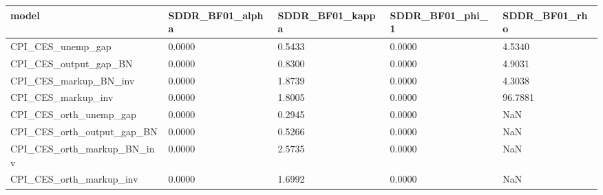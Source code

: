 \begin{tabular}{lllll}
\toprule
model & SDDR_BF01_alpha & SDDR_BF01_kappa & SDDR_BF01_phi_1 & SDDR_BF01_rho \\
\midrule
CPI_CES_unemp_gap & 0.0000 & 0.5433 & 0.0000 & 4.5340 \\
CPI_CES_output_gap_BN & 0.0000 & 0.8300 & 0.0000 & 4.9031 \\
CPI_CES_markup_BN_inv & 0.0000 & 1.8739 & 0.0000 & 4.3038 \\
CPI_CES_markup_inv & 0.0000 & 1.8005 & 0.0000 & 96.7881 \\
CPI_CES_orth_unemp_gap & 0.0000 & 0.2945 & 0.0000 & NaN \\
CPI_CES_orth_output_gap_BN & 0.0000 & 0.5266 & 0.0000 & NaN \\
CPI_CES_orth_markup_BN_inv & 0.0000 & 2.5735 & 0.0000 & NaN \\
CPI_CES_orth_markup_inv & 0.0000 & 1.6992 & 0.0000 & NaN \\
\bottomrule
\end{tabular}

